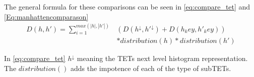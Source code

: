 	The general formula for these comparisons can be seen in \autoref{eq:compare_tet} and \autoref{Eq:manhattencomparason}
	\begin{equation}\label{eq:compare_tet}
	\begin{split}
	D(h,h') = \sum_{i=1}^{max(|h|,|h'|)} & (D(h^{\downarrow}, h'^{\downarrow})+ D(h_key, h'_key))  \\
	& * distribution(h) * distribution (h')
	\end{split}
	\end{equation}
	
	In \autoref{eq:compare_tet} $h^{\downarrow}$ meaning the TETs next level histogram representation. The $distribution()$ adds the impotence of each of the type of subTETs.
